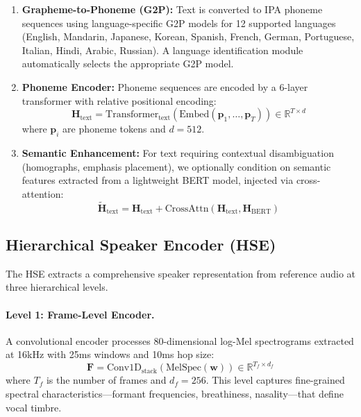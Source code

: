 \documentclass[11pt,a4paper]{article}
\begin{document}
\begin{enumerate}
    \item \textbf{Grapheme-to-Phoneme (G2P):} Text is converted to IPA phoneme sequences using language-specific G2P models for 12 supported languages (English, Mandarin, Japanese, Korean, Spanish, French, German, Portuguese, Italian, Hindi, Arabic, Russian). A language identification module automatically selects the appropriate G2P model.

    \item \textbf{Phoneme Encoder:} Phoneme sequences are encoded by a 6-layer transformer with relative positional encoding:
    \begin{equation}
        \bm{H}_{\text{text}} = \text{Transformer}_{\text{text}}(\text{Embed}(\bm{p}_1, \ldots, \bm{p}_T)) \in \mathbb{R}^{T \times d}
    \end{equation}
    where $\bm{p}_i$ are phoneme tokens and $d = 512$.

    \item \textbf{Semantic Enhancement:} For text requiring contextual disambiguation (homographs, emphasis placement), we optionally condition on semantic features extracted from a lightweight BERT model, injected via cross-attention:
    \begin{equation}
        \tilde{\bm{H}}_{\text{text}} = \bm{H}_{\text{text}} + \text{CrossAttn}(\bm{H}_{\text{text}}, \bm{H}_{\text{BERT}})
    \end{equation}
\end{enumerate}

\subsection{Hierarchical Speaker Encoder (HSE)}
\label{sec:hse}

The HSE extracts a comprehensive speaker representation from reference audio at three hierarchical levels.

\paragraph{Level 1: Frame-Level Encoder.} A convolutional encoder processes 80-dimensional log-Mel spectrograms extracted at 16kHz with 25ms windows and 10ms hop size:
\begin{equation}
    \bm{F} = \text{Conv1D}_{\text{stack}}(\text{MelSpec}(\bm{w})) \in \mathbb{R}^{T_f \times d_f}
\end{equation}
where $T_f$ is the number of frames and $d_f = 256$. This level captures fine-grained spectral characteristics---formant frequencies, breathiness, nasality---that define vocal timbre.
\end{document}
